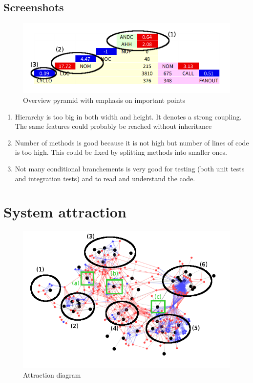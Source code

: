 \subsection{Screenshots}

\begin{figure}[h]
    \includegraphics[width=\textwidth]{OverviewPyramid_annotated.png}
    \caption{\label{fig:pyramid}Overview pyramid with emphasis on important points}
\end{figure}

\begin{enumerate}
    \item Hierarchy is too big in both width and height. It denotes a strong coupling. The same features could probably be reached without inheritance
    \item Number of methods is good because it is not high but number of lines of code is too high. This could be fixed by splitting methods into smaller ones.
    \item Not many conditional branchements is very good for testing (both unit tests and integration tests) and to read and understand the code.
\end{enumerate}

\section{System attraction}
\begin{figure}[h]
    \includegraphics[width=\textwidth]{Attraction_annotated.png}
    \caption{\label{fig:attraction} Attraction diagram}
\end{figure}

